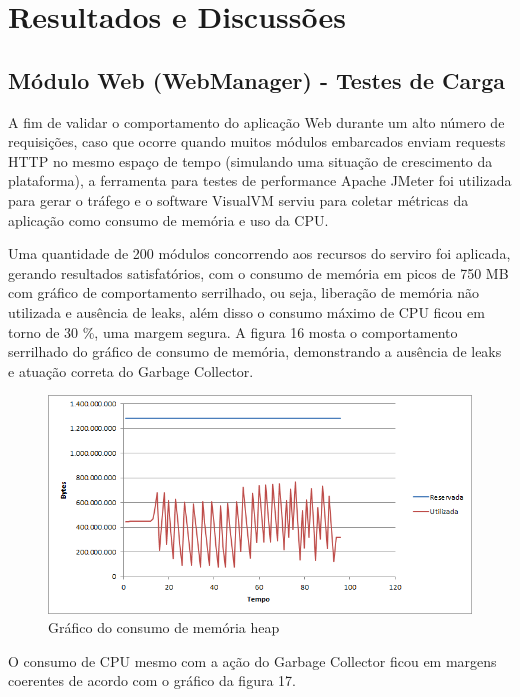 \chapter{Resultados e Discussões}
\label{cap:resultados e discussoes}

\section{Módulo Web (WebManager) - Testes de Carga}

A fim de validar o comportamento do aplicação Web durante um alto número de requisições, caso que ocorre quando muitos módulos embarcados enviam requests HTTP no mesmo espaço de tempo (simulando uma situação de crescimento da plataforma), a ferramenta para testes de performance Apache JMeter foi utilizada para gerar o tráfego e o software VisualVM serviu para coletar métricas da aplicação como consumo de memória e uso da CPU.

Uma quantidade de 200 módulos concorrendo aos recursos do serviro foi aplicada, gerando resultados satisfatórios, com o consumo de memória em picos de 750 MB com gráfico de comportamento serrilhado, ou seja, liberação de memória não utilizada e ausência de leaks, além disso o consumo máximo de CPU ficou em torno de 30 \%, uma margem segura. A figura 16 mosta o comportamento serrilhado do gráfico de consumo de memória, demonstrando a ausência de leaks e atuação correta do Garbage Collector.

\begin{figure}[!htb]
	\centering
	\includegraphics[width=15.00cm\textwidth]{figures/teste_heap.png}
	\caption{Gráfico do consumo de memória heap}
	\label{Figura 16}
\end{figure}

O consumo de CPU mesmo com a ação do Garbage Collector ficou em margens coerentes de acordo com o gráfico da figura 17.

